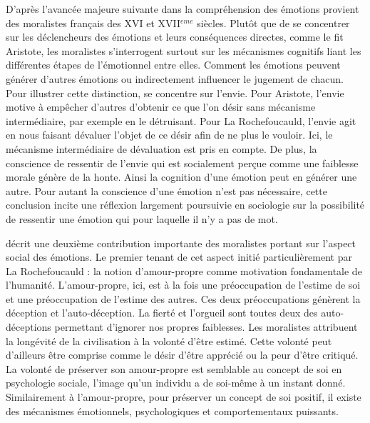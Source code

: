 \documentclass[a4paper,12pt]{report}
\begin{document}
D'après \textcite{elster98} l'avancée majeure suivante dans la compréhension des émotions provient des moralistes français des XVI et XVII$^{eme}$ siècles. Plutôt que de se concentrer sur les déclencheurs des émotions et leurs conséquences directes, comme le fit Aristote, les moralistes s'interrogent surtout sur les mécanismes cognitifs liant les différentes étapes de l'émotionnel entre elles. Comment les émotions peuvent générer d'autres émotions ou indirectement influencer le jugement de chacun. Pour illustrer cette distinction, \textcite{elster98} se concentre sur l'envie. Pour Aristote, l'envie motive à empêcher d'autres d'obtenir ce que l'on désir sans mécanisme intermédiaire, par exemple en le détruisant. Pour La Rochefoucauld, l'envie agit en nous faisant dévaluer l'objet de ce désir afin de ne plus le vouloir. Ici, le mécanisme intermédiaire de dévaluation est pris en compte. De plus, la conscience de ressentir de l'envie qui est socialement perçue comme une faiblesse morale génère de la honte. Ainsi la cognition d'une émotion peut en générer une autre. Pour autant la conscience d'une émotion n'est pas nécessaire, cette conclusion incite une réflexion largement poursuivie en sociologie sur la possibilité de ressentir une émotion qui pour laquelle il n'y a pas de mot. \par 

\textcite{elster98} décrit une deuxième contribution importante des moralistes portant sur l'aspect social des émotions. Le premier tenant de cet aspect initié particulièrement par La Rochefoucauld : la notion d'amour-propre comme motivation fondamentale de l'humanité. L'amour-propre, ici, est à la fois une préoccupation de l'estime de soi et une préoccupation de l'estime des autres. Ces deux préoccupations génèrent la déception et l'auto-déception. La fierté et l'orgueil sont toutes deux des auto-déceptions permettant d'ignorer nos propres faiblesses. Les moralistes attribuent la longévité de la civilisation à la volonté d'être estimé. Cette volonté peut d'ailleurs être comprise comme le désir d'être apprécié ou la peur d'être critiqué. La volonté de préserver son amour-propre est semblable au concept de soi en psychologie sociale, l'image qu'un individu a de soi-même à un instant donné. Similairement à l'amour-propre, pour préserver un concept de soi positif, il existe des mécanismes émotionnels, psychologiques et comportementaux puissants. \par 
\end{document}
